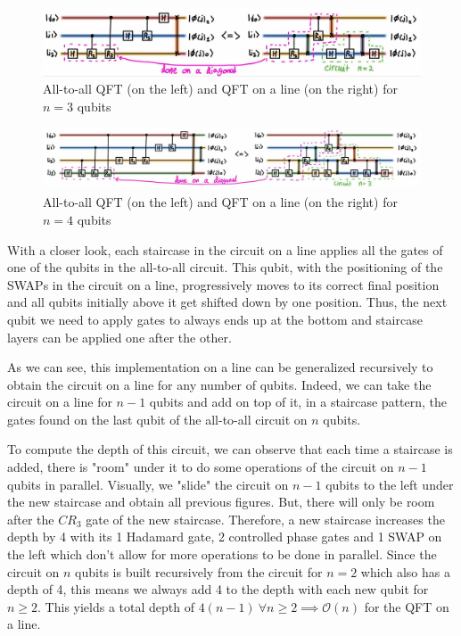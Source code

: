 \begin{figure}[H]
    \centering
    \includegraphics*[scale=0.23]{images/qft_line_3_qubits.jpg}
    \caption{All-to-all QFT (on the left) and QFT on a line (on the right) for $n=3$ qubits}
    \label{qft_line_3_qubits}
\end{figure}

\begin{figure}[H]
    \centering
    \includegraphics*[scale=0.23]{images/qft_line_4_qubits.jpg}
    \caption{All-to-all QFT (on the left) and QFT on a line (on the right) for $n=4$ qubits}
    \label{qft_line_4_qubits}
\end{figure}

With a closer look, each staircase in the circuit on a line applies all the gates of one of the qubits in the all-to-all circuit. This qubit, with the positioning of the SWAPs in the circuit on a line, progressively moves to its correct final position and all qubits initially above it get shifted down by one position. Thus, the next qubit we need to apply gates to always ends up at the bottom and staircase layers can be applied one after the other.

As we can see, this implementation on a line can be generalized recursively to obtain the circuit on a line for any number of qubits. Indeed, we can take the circuit on a line for $n-1$ qubits and add on top of it, in a staircase pattern, the gates found on the last qubit of the all-to-all circuit on $n$ qubits. 

To compute the depth of this circuit, we can observe that each time a staircase is added, there is "room" under it to do some operations of the circuit on $n-1$ qubits in parallel. Visually, we "slide" the circuit on $n-1$ qubits to the left under the new staircase and obtain all previous figures. But, there will only be room after the $CR_3$ gate of the new staircase. Therefore, a new staircase increases the depth by 4 with its 1 Hadamard gate, 2 controlled phase gates and 1 SWAP on the left which don't allow for more operations to be done in parallel. Since the circuit on $n$ qubits is built recursively from the circuit for $n=2$ which also has a depth of 4, this means we always add 4 to the depth with each new qubit for $n \geq 2$. This yields a total depth of $4(n-1) \ \forall n\geq 2 \implies \mathcal{O}(n)$ for the QFT on a line.

